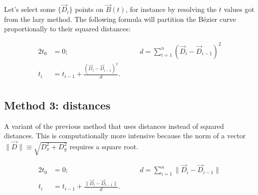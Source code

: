 \documentclass{scrartcl}
\newcommand\V[1]{\vec{#1}}
\begin{document}
Let's select some $\{\V{D}_i\}$ points on $\V{B}(t)$, for instance by
resolving the $t$ values got from the lazy method. The following formula
will partition the Bézier curve proportionally to their squared
distances:

\begin{alignat*}{2}
    t_0 &= 0; &\qquad d = \sum_{i=1}^n \left( \V{D}_i - \V{D}_{i-1} \right)^2 \\[-20pt]
    t_i &= t_{i-1} + \frac{\left( \V{D}_i - \V{D}_{i-1} \right)^2}{d}. \\
\end{alignat*}

\subsection{Method 3: distances}

A variant of the previous method that uses distances instead of squared
distances. This is computationally more intensive because the norm of
a vector $ \| \V{D} \| \equiv \sqrt{D_x^2 + D_y^2}$ requires a square
root.

\begin{alignat*}{2}
    t_0 &= 0; &\qquad d = \sum_{i=1}^n \| \V{D}_i - \V{D}_{i-1} \| \\[-16pt]
    t_i &= t_{i-1} + \frac{\| \V{D}_i - \V{D}_{i-1} \|}{d}. \\
\end{alignat*}
\end{document}
